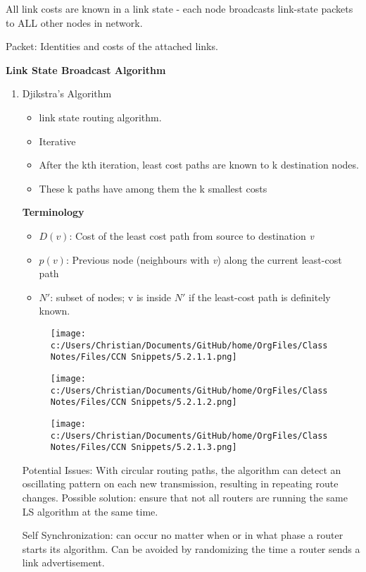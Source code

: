 \documentclass[11pt]{article}
\begin{document}
All link costs are known in a link state - each node broadcasts link-state packets to ALL other nodes in network.

Packet: Identities and costs of the attached links.

\textbf{Link State Broadcast Algorithm}

\begin{enumerate}
\item Djikstra's Algorithm
\label{sec:org97632e8}

\begin{itemize}
\item link state routing algorithm.
\item Iterative
\item After the kth iteration, least cost paths are known to k destination nodes.
\item These k paths have among them the k smallest costs
\end{itemize}


\textbf{Terminology}
\begin{itemize}
\item \(D(v)\): Cost of the least cost path from source to destination \emph{v}
\item \(p(v)\): Previous node (neighbours with \emph{v}) along the current least-cost path
\item \(N'\): subset of nodes; v is inside \(N'\) if the least-cost path is definitely known.
\end{itemize}


\clearpage

\begin{figure}[htbp]
\centering
\texttt{[image: c:/Users/Christian/Documents/GitHub/home/OrgFiles/Class Notes/Files/CCN Snippets/5.2.1.1.png]}
\end{figure}

\begin{figure}[htbp]
\centering
\texttt{[image: c:/Users/Christian/Documents/GitHub/home/OrgFiles/Class Notes/Files/CCN Snippets/5.2.1.2.png]}
\end{figure}

\begin{figure}[htbp]
\centering
\texttt{[image: c:/Users/Christian/Documents/GitHub/home/OrgFiles/Class Notes/Files/CCN Snippets/5.2.1.3.png]}
\end{figure}

\clearpage

Potential Issues:
With circular routing paths, the algorithm can detect an oscillating pattern on each new transmission, resulting in repeating route changes. Possible solution: ensure that not all routers are running the same LS algorithm at the same time.

Self Synchronization: can occur no matter when or in what phase a router starts its algorithm. Can be avoided by randomizing the time a router sends a link advertisement.
\end{enumerate}
\end{document}
